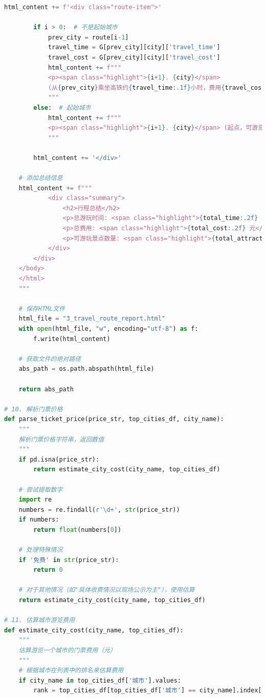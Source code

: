 \documentclass[withoutpreface,bwprint]{cumcmthesis} %
\begin{document}
\begin{appendices}
\begin{lstlisting}[language=python]
        html_content += f'<div class="route-item">'
        
        if i > 0:  # 不是起始城市
            prev_city = route[i-1]
            travel_time = G[prev_city][city]['travel_time']
            travel_cost = G[prev_city][city]['travel_cost']
            html_content += f"""
            <p><span class="highlight">{i+1}. {city}</span> 
            (从{prev_city}乘坐高铁约{travel_time:.1f}小时，费用{travel_cost:.0f}元，可游览{attractions}个景点，门票约{ticket_price:.0f}元)</p>
            """
        else:  # 起始城市
            html_content += f"""
            <p><span class="highlight">{i+1}. {city}</span> (起点，可游览{attractions}个景点，门票约{ticket_price:.0f}元)</p>
            """
        
        html_content += '</div>'
    
    # 添加总结信息
    html_content += f"""
            <div class="summary">
                <h2>行程总结</h2>
                <p>总游玩时间: <span class="highlight">{total_time:.2f} 小时</span></p>
                <p>总费用: <span class="highlight">{total_cost:.2f} 元</span></p>
                <p>可游玩景点数量: <span class="highlight">{total_attractions}</span></p>
            </div>
        </div>
    </body>
    </html>
    """
    
    # 保存HTML文件
    html_file = "3_travel_route_report.html"
    with open(html_file, "w", encoding="utf-8") as f:
        f.write(html_content)
    
    # 获取文件的绝对路径
    abs_path = os.path.abspath(html_file)
    
    return abs_path

# 10. 解析门票价格
def parse_ticket_price(price_str, top_cities_df, city_name):
    """
    解析门票价格字符串，返回数值
    """
    if pd.isna(price_str):
        return estimate_city_cost(city_name, top_cities_df)
    
    # 尝试提取数字
    import re
    numbers = re.findall(r'\d+', str(price_str))
    if numbers:
        return float(numbers[0])
    
    # 处理特殊情况
    if '免费' in str(price_str):
        return 0
    
    # 对于其他情况（如"具体收费情况以现场公示为主"），使用估算
    return estimate_city_cost(city_name, top_cities_df)

# 11. 估算城市游览费用
def estimate_city_cost(city_name, top_cities_df):
    """
    估算游览一个城市的门票费用（元）
    """
    # 根据城市在列表中的排名来估算费用
    if city_name in top_cities_df['城市'].values:
        rank = top_cities_df[top_cities_df['城市'] == city_name].index[0] + 1
        

\end{lstlisting}
\end{appendices}
\end{document}
